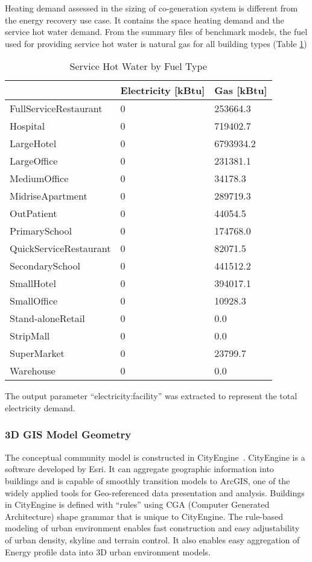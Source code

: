 \documentclass[hidelinks,12pt]{article}
\newcommand{\tref}[1]{Table \ref{#1}}
\begin{document}
Heating demand assessed in the sizing of co-generation system is
different from the energy recovery use case. It contains the space
heating demand and the service hot water demand. From the summary
files of benchmark models, the fuel used for providing service hot
water is natural gas for all building types (\tref{tab:hotWater})
\begin{table}[h!]
\centering
\caption{Service Hot Water by Fuel Type}
\label{tab:hotWater}
\begin{tabular}{l|l|l}
  \hline
                       &  Electricity {[}kBtu{]} & Gas {[}kBtu{]} \\
  \hline
  \hline
FullServiceRestaurant  & 0 & 253664.3       \\
Hospital               & 0 & 719402.7       \\
LargeHotel             & 0 & 6793934.2      \\
LargeOffice            & 0 & 231381.1       \\
MediumOffice           & 0 & 34178.3        \\
MidriseApartment       & 0 & 289719.3       \\
OutPatient             & 0 & 44054.5        \\
PrimarySchool          & 0 & 174768.0       \\
QuickServiceRestaurant & 0 & 82071.5        \\
SecondarySchool        & 0 & 441512.2       \\
SmallHotel             & 0 & 394017.1       \\
SmallOffice            & 0 & 10928.3        \\
Stand-aloneRetail      & 0 & 0.0            \\
StripMall              & 0 & 0.0            \\
SuperMarket            & 0 & 23799.7        \\
Warehouse              & 0 & 0.0            \\
  \hline
\end{tabular}
\end{table}

The output parameter ``electricity:facility'' was extracted to
represent the total electricity demand.

\pagebreak
\subsubsection{3D GIS Model Geometry}
The conceptual community model is constructed in
CityEngine~\cite{cityEngine2015}. CityEngine is a software developed
by Esri. It can aggregate geographic information into buildings and is
capable of smoothly transition models to ArcGIS\cite{ArcGIS2015}, one
of the widely applied tools for Geo-referenced data presentation and
analysis. Buildings in CityEngine is defined with ``rules'' using CGA
(Computer Generated Architecture) shape grammar that is unique to
CityEngine. The rule-based modeling of urban environment enables fast
construction and easy adjustability of urban density, skyline and
terrain control. It also enables easy aggregation of Energy profile
data into 3D urban environment models.
\end{document}
